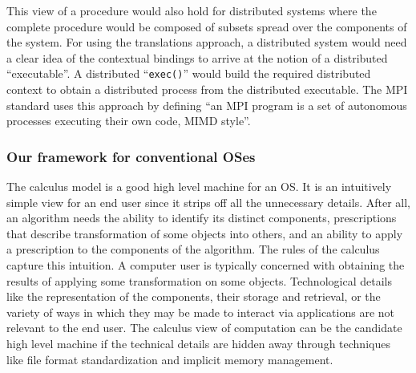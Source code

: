 \documentclass[draft]{article}
\begin{document}
This view of a procedure would also hold for distributed systems where
the complete  procedure would be  composed of subsets spread  over the
components  of the  system.  For  using the  translations  approach, a
distributed system would need a  clear idea of the contextual bindings
to  arrive   at  the  notion  of  a   distributed  ``executable''.   A
distributed ``\texttt{exec()}''  would build the  required distributed
context  to   obtain  a  distributed  process   from  the  distributed
executable.  The MPI  standard uses this approach \cite{mpi:processes}
by  defining  ``an  MPI  program  is a  set  of  autonomous  processes
executing their own code, MIMD style''.

\subsubsection{Our framework for conventional OSes}
\label{sec:our:framework:for:os}

The  calculus  model is a good high level  machine for an OS.
It is an  intuitively simple view for an end user  since it strips off
all  the  unnecessary details.   After  all,  an  algorithm needs  the
ability  to  identify  its  distinct  components,  prescriptions  that
describe transformation of some objects into others, and an ability to
apply a prescription to the components of the algorithm.  The rules of
the   calculus capture  this intuition.   A computer  user is
typically  concerned  with  obtaining  the results  of  applying  some
transformation  on  some  objects.   Technological  details  like  the
representation of the components,  their storage and retrieval, or the
variety of ways in which they may be made to interact via applications
are  not relevant to  the end  user.  The   calculus  view of
computation can be  the candidate high level machine  if the technical
details  are   hidden  away   through  techniques  like   file  format
standardization  and implicit  memory  management.
\end{document}
